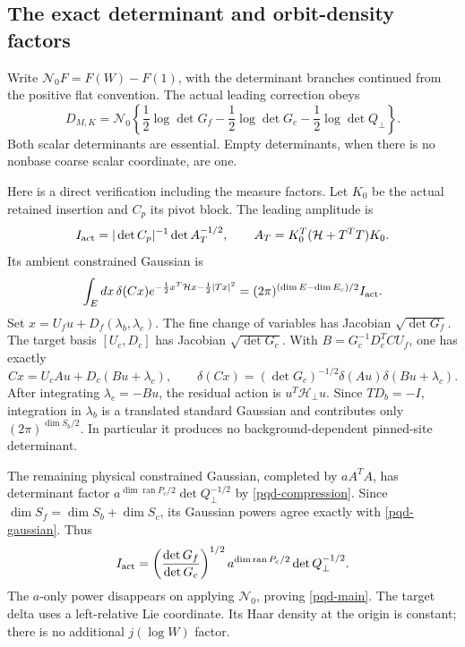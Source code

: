 \documentclass[11pt]{article}
\theoremstyle{remark}
\begin{document}
\subsection{The exact determinant and orbit-density factors}
\label{pqd-identity-section}

Write $\mathcal N_0F=F(W)-F(1)$, with the determinant branches continued
from the positive flat convention. The actual leading correction obeys
\begin{equation}
 \boxed{\displaystyle
 D_{M,K}=\mathcal N_0\left\{
 \frac12\log\det G_f-\frac12\log\det G_c
                         -\frac12\log\det Q_\perp\right\}.}
 \label{pqd-main}
\end{equation}
Both scalar determinants are essential. Empty determinants, when there
is no nonbase coarse scalar coordinate, are one.

Here is a direct verification including the measure factors. Let
$K_0$ be the actual retained insertion and $C_p$ its pivot block. The
leading amplitude is
\begin{equation}
 I_{\rm act}=|\det C_p|^{-1}\det A_T^{-1/2},\qquad
 A_T=K_0^T(\mathcal H+T^TT)K_0.\label{pqd-amplitude}
\end{equation}
Its ambient constrained Gaussian is
\begin{equation}
 \int_E dx\,\delta(Cx)
  e^{-\frac12x^T\mathcal H x-\frac12|Tx|^2}
 =(2\pi)^{(\dim E-\dim E_c)/2}I_{\rm act}.
 \label{pqd-gaussian}
\end{equation}
Set $x=U_fu+D_f(\lambda_b,\lambda_c)$. The fine change of variables
has Jacobian $\sqrt{\det G_f}$. The target basis $[U_c,D_c]$ has
Jacobian $\sqrt{\det G_c}$. With
$B=G_c^{-1}D_c^TCU_f$, one has exactly
\begin{equation}
 Cx=U_cAu+D_c(Bu+\lambda_c),\qquad
 \delta(Cx)=(\det G_c)^{-1/2}
                      \delta(Au)\delta(Bu+\lambda_c).
 \label{pqd-target-delta}
\end{equation}
After integrating $\lambda_c=-Bu$, the residual action is
$u^T\mathcal H_\perp u$. Since $TD_b=-I$, integration in
$\lambda_b$ is a translated standard Gaussian and contributes only
$(2\pi)^{\dim S_b/2}$. In particular it produces no background-dependent
pinned-site determinant.

The remaining physical constrained Gaussian, completed by $aA^TA$,
has determinant factor
$a^{\dim\operatorname{ran}P_c/2}\det Q_\perp^{-1/2}$ by
\eqref{pqd-compression}. Since
$\dim S_f=\dim S_b+\dim S_c$, its Gaussian powers agree exactly with
\eqref{pqd-gaussian}. Thus
\begin{equation}
 I_{\rm act}=
 \left(\frac{\det G_f}{\det G_c}\right)^{1/2}
 a^{\dim\operatorname{ran}P_c/2}\det Q_\perp^{-1/2}.
 \label{pqd-amplitude-result}
\end{equation}
The $a$-only power disappears on applying $\mathcal N_0$, proving
\eqref{pqd-main}. The target delta uses a left-relative Lie coordinate.
Its Haar density at the origin is constant; there is no additional
$j(\log W)$ factor.
\end{document}
